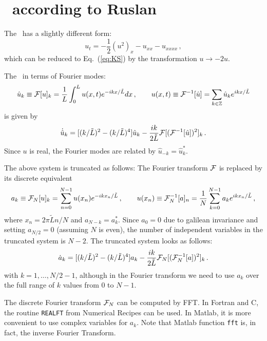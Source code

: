 {\section{\KS\ according to Ruslan}
The \KSe\ has a slightly different form:
\begin{equation}
  u_t=-{\textstyle\frac{1}{2}}(u^2)_x-u_{xx}- u_{xxxx} \, ,
\end{equation}
which can be reduced to Eq.~(\ref{eq:KS}) by the transformation $u
\rightarrow -2u$.

The \KSe\ in terms of Fourier modes:
\begin{equation}
  \hat{u}_k \equiv {\cal F}[u]_k = \frac{1}{L}\int_0^L u(x,t) e^{-ikx/\tilde{L}}dx\,,
  \qquad u(x,t) \equiv {\cal F}^{-1}[\hat{u}] = \sum_{k\in{\mathbb Z}} \hat{u}_k e^{ikx/\tilde{L}}
\end{equation}
 is given by
\begin{equation}
  \dot{\hat{u}}_k =[(k/\tilde{L})^2-(k/\tilde{L})^4]\hat{u}_k -
  \frac{ik}{2\tilde{L}}{\cal F}[({\cal F}^{-1}[\hat{u}])^2]_k\,.
\end{equation}
Since $u$ is real, the Fourier modes are related by $\hat{u}_{-k} =
\hat{u}^\ast_k$.

The above system is truncated as follows: The Fourier transform
${\cal F}$ is replaced by its discrete equivalent
\begin{equation}
  a_k \equiv {\cal F}_N[u]_k = \sum_{n = 0}^{N-1} u(x_n)
  e^{-ikx_n/\tilde{L}}\,,\qquad u(x_n) \equiv {\cal F}_N^{-1}[a]_n
  = \frac{1}{N}\sum_{k = 0}^{N-1} a_k e^{ikx_n/\tilde{L}}\,,
\end{equation}
where $x_n = 2\pi\tilde{L}n/N$ and $a_{N-k} = a^\ast_k$.  Since $a_0
= 0$ due to galilean invariance and setting $a_{N/2} = 0$ (assuming
$N$ is even), the number of independent variables in the truncated
system is $N-2$.  The truncated system looks as follows:
\begin{equation}
  \dot{a}_k =[(k/\tilde{L})^2-(k/\tilde{L})^4]a_k -
  \frac{ik}{2\tilde{L}}{\cal F}_N[({\cal F}_N^{-1}[a])^2]_k\,.
\end{equation}
with $k = 1,\ldots,N/2-1$, although in the Fourier transform we need
to use $a_k$ over the full range of $k$ values from 0 to $N-1$.

The discrete Fourier transform ${\cal F}_N$ can be computed by FFT.
In Fortran and C, the routine {\tt REALFT} from Numerical Recipes
can be used.  In Matlab, it is more convenient to use complex
variables for $a_k$.  Note that Matlab function {\tt fft} is, in
fact, the inverse Fourier Transform.

}
